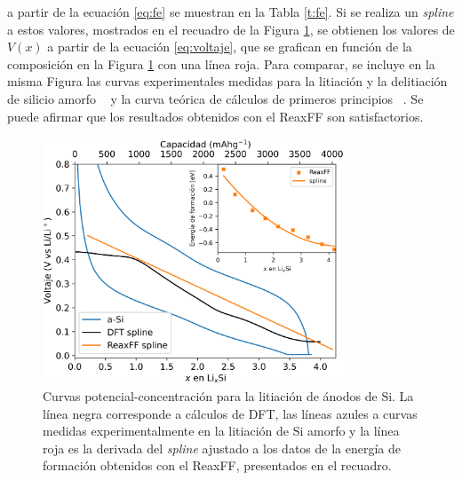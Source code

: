 a partir de la ecuación \ref{eq:fe} se muestran en la Tabla \ref{t:fe}. 
Si se realiza un \textit{spline} a estos valores, mostrados en el recuadro de la
Figura \ref{fig:voltaje}, se obtienen los valores de $V(x)$ a partir de la ecuación
\ref{eq:voltaje}, que se grafican en función de la composición en la Figura 
\ref{fig:voltaje} con una línea roja. Para comparar, se incluye en la misma Figura
las curvas experimentales medidas para la litiación y la delitiación de silicio
amorfo ~\cite{hatchard2004} y la curva teórica de cálculos de primeros principios 
~\cite{chevrier2009}. Se puede afirmar que los resultados obtenidos con el ReaxFF 
son satisfactorios.
\begin{figure}[h]
    \centering
    \includegraphics[width=0.8\textwidth]{Silicio/caracterizacion/resultados/electroquimica/voltaje.png}
    \caption{Curvas potencial-concentración para la litiación de ánodos de Si.
    La línea negra corresponde a cálculos de DFT, las líneas azules a 
    curvas medidas experimentalmente en la litiación de Si amorfo y la línea 
    roja es la derivada del \textit{spline} ajustado a los datos de la energía 
    de formación obtenidos con el ReaxFF, presentados en el recuadro.}
    \label{fig:voltaje}
\end{figure}
